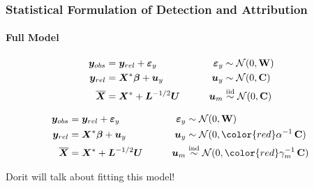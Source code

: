 \documentclass{beamer}
\newcommand{\C}{\ensuremath{\text{Cov}}}
\newcommand{\iid}{\ensuremath{\stackrel{\text{iid}}{\sim}}}
\def\*#1{\bm{#1}}
\def\C{\textbf{\text{C}}}
\def\W{\textbf{\text{W}}}
\begin{document}
\begin{frame}
\frametitle{Statistical Formulation of Detection and Attribution}
\framesubtitle{Full Model}

\begin{block}{}
\vspace*{-\baselineskip}\setlength\belowdisplayshortskip{0pt}
\begin{alignat*}{3}
\*y_{obs} &= \*y_{rel} + \*\varepsilon_y  \qquad \quad &\*\varepsilon_y &\sim \mathcal N(0,\W)\\
\*y_{rel} &= \*X^* \*\beta + \*u_y \nonumber  \qquad  &\*u_y &\sim \mathcal N(0,\C) \\
\overline{\*X} &= \*X^* + \*L^{-1/2} \*U \qquad    &\*u_m &\iid \mathcal N(0,\C)  \:
\end{alignat*}
\end{block}

\pause

\begin{exampleblock}{}
\vspace*{-\baselineskip}\setlength\belowdisplayshortskip{0pt}
\begin{alignat*}{3}
\*y_{obs} &= \*y_{rel} + \*\varepsilon_y  \qquad \quad &\*\varepsilon_y &\sim \mathcal N(0,\W)\\
\*y_{rel} &= \*X^* \*\beta + \*u_y \nonumber  \qquad  &\*u_y &\sim \mathcal N(0,{\color{red} \alpha^{-1}}\,\C) \\
\overline{\*X} &= \*X^* + \*L^{-1/2} \*U \qquad    &\*u_m &\stackrel{\text{ind}}{\sim} \mathcal N(0,{\color{red}\gamma_m^{-1}} \, \C)  \:
\end{alignat*}
\end{exampleblock}

\alert{Dorit will talk about fitting this model!}
\end{frame}




\end{document}
